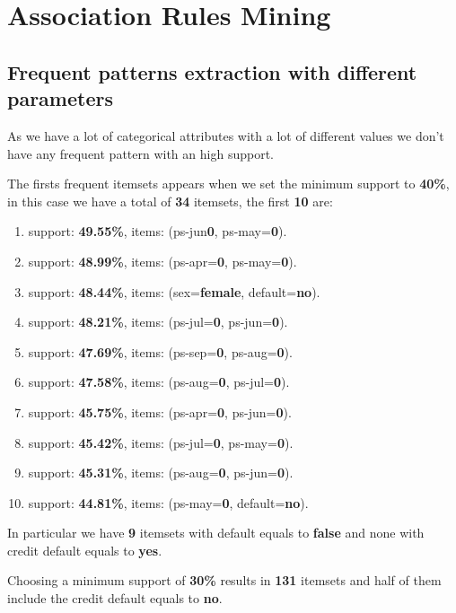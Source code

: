 \chapter{Association Rules Mining}

\section{Frequent patterns extraction with different parameters}

As we have a lot of categorical attributes with a lot of different values we don't have any frequent pattern with an high support. 

The firsts frequent itemsets appears when we set the minimum support to \textbf{40\%}, in this case we have a total of \textbf{34} itemsets, the first \textbf{10} are:

\begin{enumerate}
  \item support: \textbf{49.55\%}, items: (ps-jun\textbf{0}, ps-may=\textbf{0}).
  \item support: \textbf{48.99\%}, items: (ps-apr=\textbf{0}, ps-may=\textbf{0}).
  \item support: \textbf{48.44\%}, items: (sex=\textbf{female}, default=\textbf{no}).
  \item support: \textbf{48.21\%}, items: (ps-jul=\textbf{0}, ps-jun=\textbf{0}).
  \item support: \textbf{47.69\%}, items: (ps-sep=\textbf{0}, ps-aug=\textbf{0}).
  \item support: \textbf{47.58\%}, items: (ps-aug=\textbf{0}, ps-jul=\textbf{0}).
  \item support: \textbf{45.75\%}, items: (ps-apr=\textbf{0}, ps-jun=\textbf{0}).
  \item support: \textbf{45.42\%}, items: (ps-jul=\textbf{0}, ps-may=\textbf{0}).
  \item support: \textbf{45.31\%}, items: (ps-aug=\textbf{0}, ps-jun=\textbf{0}).
  \item support: \textbf{44.81\%}, items: (ps-may=\textbf{0}, default=\textbf{no}).
\end{enumerate}

In particular we have \textbf{9} itemsets with default equals to \textbf{false} and none with credit default equals to \textbf{yes}.

\smallskip

Choosing a minimum support of \textbf{30\%} results in \textbf{131} itemsets and half of them include the credit default equals to \textbf{no}.

